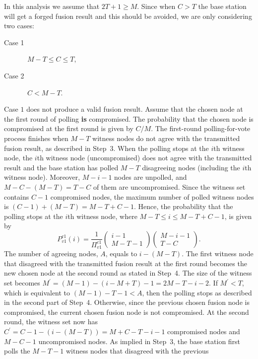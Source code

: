 \documentclass[12pt, onecolumn, draftcls]{IEEEtran}
\begin{document}
In this analysis we assume that $2T+1\ge M$. Since when $C>T$ the
base station will get a forged fusion result and this should be
avoided, we are only considering two cases:
\begin{description}
\item[Case 1]\ $M-T \le C \le T$,
\item[Case 2]\ $C<M-T$.
\end{description}
Case $1$ does not produce a valid fusion result. Assume that the
chosen node at the first round of polling {\bf is} compromised. The
probability that the chosen node is compromised at the first round
is given by $C/M$. The first-round polling-for-vote process finishes
when $M-T$ witness nodes do not agree with the transmitted fusion
result, as described in Step~3. When the polling stops at the $i$th
witness node, the $i$th witness node (uncompromised) does not agree
with the transmitted result and the base station has polled $M-T$
disagreeing nodes (including the $i$th witness node). Moreover,
$M-i-1$ nodes are unpolled, and $M-C-(M-T)=T-C$ of them are
uncompromised. Since the witness set contains $C-1$ compromised
nodes, the maximum number of polled witness nodes is
$(C-1)+(M-T)=M-T+C-1$. Hence, the probability that the polling stops
at the $i$th witness node, where $M-T \le i \le M-T+C-1$, is given
by
\begin{equation*}
P_{v1}^{c1}(i)=\frac{1}{\Pi_{v1}^{c1}}\left(\begin{array}{c} i-1 \\
M-T-1
\end{array}\right) \left(\begin{array}{c} M-i-1 \\ T-C
\end{array}\right).
\end{equation*}
The number of agreeing nodes, $A$, equals to $i-(M-T)$. The first
witness node that disagreed with the transmitted fusion result at
the first round becomes the new chosen node at the second round as
stated in Step~4. The size of the witness set becomes $M^{\prime} =
(M-1)-(i-M+T)-1=2M-T-i-2$. If $M^{\prime}<T$, which is equivalent to
$(M-1)-T-1<A$, then the polling stops as described in the second
part of Step~4. Otherwise, since the previous chosen fusion node is
compromised, the current chosen fusion node is not compromised. At
the second round, the witness set now has
$C^{\prime}=C-1-(i-(M-T))=M+C-T-i-1$ compromised nodes and $M-C-1$
uncompromised nodes. As implied in Step~3, the base station first
polls the $M-T-1$ witness nodes that disagreed with the previous
\end{document}
